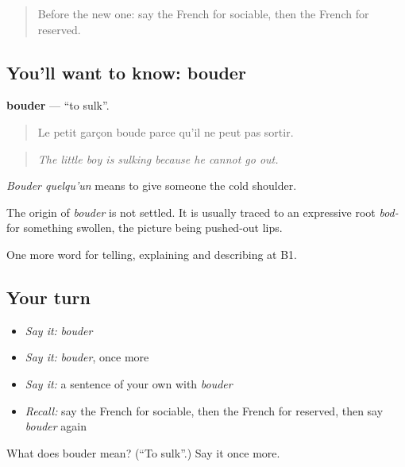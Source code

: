 \begin{quote}
Before the new one: say the French for sociable, then the French for reserved.
\end{quote}

\subsection*{You'll want to know: bouder}
\textbf{bouder} — \textquotedblleft{}to sulk\textquotedblright{}.

\begin{quote}
Le petit garçon boude parce qu'il ne peut pas sortir.
\end{quote}

\begin{quote}
\emph{The little boy is sulking because he cannot go out.}
\end{quote}

\emph{Bouder quelqu'un} means to give someone the cold shoulder.

\begin{cousinweb}
The origin of \emph{bouder} is not settled. It is usually traced to an expressive root \emph{bod-} for something swollen, the picture being pushed-out lips.
\end{cousinweb}

\begin{grammarlens}[title={What you've built}]
One more word for telling, explaining and describing at B1.
\end{grammarlens}

\subsection*{Your turn}
\begin{itemize}
\raggedright
  \item \emph{Say it:} \emph{bouder}
  \item \emph{Say it:} \emph{bouder}, once more
  \item \emph{Say it:} a sentence of your own with \emph{bouder}
  \item \emph{Recall:} say the French for sociable, then the French for reserved, then say \emph{bouder} again
\end{itemize}

\begin{tcolorbox}[breakable,colback=teal!4,colframe=teal!35!black,title={Before you move on}]
What does bouder mean? (\textquotedblleft{}To sulk\textquotedblright{}.) Say it once more.
\end{tcolorbox}

